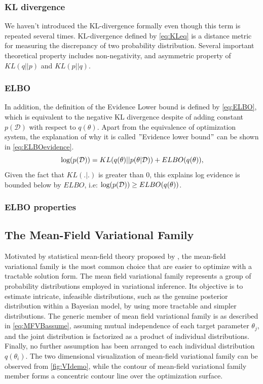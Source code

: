 \subsubsection{KL divergence}
We haven't introduced the KL-divergence formally even though this term is repeated several times. KL-divergence defined by \autoref{eq:KLeq} is a distance metric for measuring the discrepancy of two probability distribution. Several important theoretical property includes non-negativity, and asymmetric property of $KL(q||p)$ and $KL(p||q)$.

\subsubsection{ELBO}
In addition, the definition of the Evidence Lower bound is defined by \autoref{eq:ELBO}, which is equivalent to the negative KL divergence despite of adding constant $p(\mathcal{D})$ with respect to $q(\theta)$. 
Apart from the equivalence of optimization system, the explanation of why it is called $"$Evidence lower bound$"$ can be shown in \autoref{eq:ELBOevidence}.
\begin{equation}
	\label{eq:ELBOevidence}
	\textnormal{log}(p(\mathcal{D})) = KL(q(\theta)||p(\theta|\mathcal{D})) + ELBO(q(\theta)),
\end{equation}
Given the fact that $KL(.|.)$ is greater than 0, this explains log evidence is bounded below by $ELBO$, i.e: $\textnormal{log}(p(\mathcal{D})) \geq ELBO(q(\theta))$.
\subsubsection{ELBO properties}

\subsection{The Mean-Field Variational Family} 
Motivated by statistical mean-field theory proposed by \cite{parisi1988statistical}, the mean-field variational family is the most common choice that are easier to optimize with a tractable solution form.
The mean field variational family represents a group of probability distributions employed in variational inference. Its objective is to estimate intricate, infeasible distributions, such as the genuine posterior distribution within a Bayesian model, by using more tractable and simpler distributions.
The generic member of mean field variational family is as described in \autoref{eq:MFVBassume}, assuming mutual independence of each target parameter $\theta_j$, and the joint distribution is factorized as a product of individual distributions. Finally, no further assumption has been arranged to each individual distribution $q(\theta_i)$.
The two dimensional visualization of mean-field variational family can be observed from \autoref{fig:VIdemo}, while the contour of mean-field variational family member forms a concentric contour line over the optimization surface.











